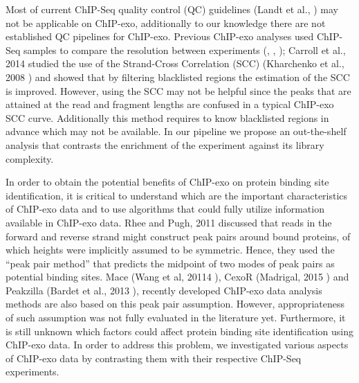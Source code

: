 \documentclass{bmcart}\usepackage[]{graphicx}\usepackage[]{color}
\begin{document}
Most of current ChIP-Seq quality control (QC) guidelines (Landt et
al., \cite{encode_qc}) may not be applicable on ChIP-exo, additionally
to our knowledge there are not established QC pipelines for
ChIP-exo. Previous ChIP-exo analyses used ChIP-Seq samples to compare
the resolution between experiments (\cite{exo1}, \cite{exo2},
\cite{exoillumina}); Carroll et al., 2014 \cite{carroll.qc} studied
the use of the Strand-Cross Correlation (SCC) (Kharchenko et al., 2008
\cite{strandcc}) and showed that by filtering blacklisted regions the
estimation of the SCC is improved. However, using the SCC may not be
helpful since the peaks that are attained at the read and fragment
lengths are confused in a typical ChIP-exo SCC curve. Additionally
this method requires to know blacklisted regions in advance which may
not be available. In our pipeline we propose an out-the-shelf analysis
that contrasts the enrichment of the experiment against its library
complexity.

In order to obtain the potential benefits of ChIP-exo on protein
binding site identification, it is critical to understand which are
the important characteristics of ChIP-exo data and to use algorithms
that could fully utilize information available in ChIP-exo data. Rhee
and Pugh, 2011 \cite{exo1} discussed that reads in the forward and
reverse strand might construct peak pairs around bound proteins, of
which heights were implicitly assumed to be symmetric. Hence, they
used the ``peak pair method'' that predicts the midpoint of two modes
of peak pairs as potential binding sites. Mace (Wang et al, 20114
\cite{mace}), CexoR (Madrigal, 2015 \cite{cexor}) and Peakzilla
(Bardet et al., 2013 \cite{peakzilla}), recently developed ChIP-exo
data analysis methods are also based on this peak pair
assumption. However, appropriateness of such assumption was not fully
evaluated in the literature yet. Furthermore, it is still unknown
which factors could affect protein binding site identification using
ChIP-exo data. In order to address this problem, we investigated
various aspects of ChIP-exo data by contrasting them with their
respective ChIP-Seq experiments.
\end{document}
